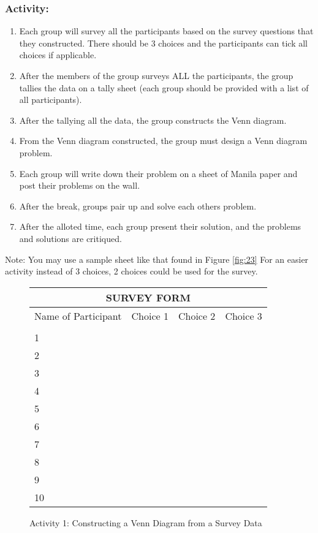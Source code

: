 \subsubsection*{Activity:}
\begin{enumerate}
\item Each group will survey all the participants based on the survey questions that they constructed. There should be 3 choices and the participants can tick all choices if applicable.
\item After the members of the group surveys ALL the participants, the group tallies the data on a
tally sheet (each group should be provided with a list of all participants).
\item After the tallying all the data, the group constructs the Venn diagram.
\item From the Venn diagram constructed, the group must design a Venn diagram problem.
\item Each group will write down their problem on a sheet of Manila paper and post their
problems on the wall.
\item After the break, groups pair up and solve each others problem.
\item After the alloted time, each group present their solution, and the problems and solutions
are critiqued.
\end{enumerate}
Note: You may use a sample sheet like that found in Figure \eqref{fig:23} For an easier activity instead of 3 choices, 2 choices could be used for the survey.
{\renewcommand{\arraystretch}{1.75}
\begin{figure}
\centering
\begin{tabular}[m]{|l|l|l|l|}
\hline
\multicolumn{4}{|c|}{\LARGE\textbf{SURVEY FORM}}\\
\hline
Name of Participant & Choice 1 & Choice 2 & Choice 3\\ \cline{2-4}
 & & & \\ \hline
1 & & & \\ \hline
2 & & & \\ \hline
3 & & & \\ \hline
4 & & & \\ \hline
5 & & & \\ \hline
6 & & & \\ \hline
7 & & & \\ \hline
8 & & & \\ \hline
9 & & & \\ \hline
10 & & & \\ \hline
\end{tabular}
\caption{Activity 1: Constructing a Venn Diagram from a Survey Data}
\label{fig:23}
\end{figure}
}

